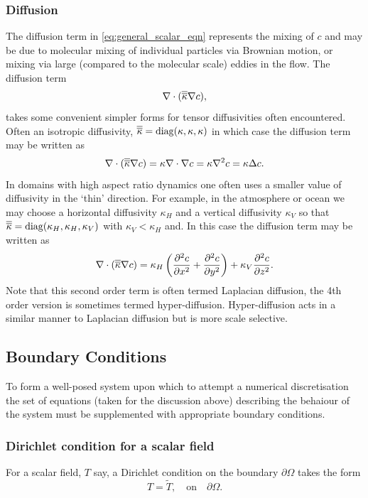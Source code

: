 \subsubsection{Diffusion}
The diffusion term in \eqref{eq:general_scalar_eqn} represents the mixing of $c$ and may be due to 
molecular mixing of individual particles via Brownian motion, or mixing via large (compared to the
molecular scale) eddies in the flow.
The diffusion term
\begin{equation}\label{eq:scalar_diffusion}
\nabla\cdot(\kaptens\nabla c),
\end{equation}
takes some convenient simpler forms for tensor diffusivities often encountered. Often an
isotropic diffusivity, $\kaptens = \mathrm{diag}(\kappa,\kappa,\kappa)$ in which case the diffusion term
may be written as
\begin{equation}\label{eq:scalar_isotropic_diffusion}
\nabla\cdot(\kaptens\nabla c) = \kappa\nabla\cdot\nabla c = \kappa\nabla^2 c = \kappa\Delta c.
\end{equation}
In domains with high aspect ratio dynamics one often uses a smaller value of diffusivity in the `thin'
direction. For example, in the atmosphere or ocean we may choose a horizontal diffusivity $\kappa_H$ and a
vertical diffusivity $\kappa_V$ so that
$\kaptens = \mathrm{diag}(\kappa_H,\kappa_H,\kappa_V)$ with $\kappa_V < \kappa_H$ and. 
In this case the diffusion term may be written as
\begin{equation}\label{eq:scalar_isotropic_diffusion}
\nabla\cdot(\kaptens\nabla c) = \kappa_H \left(\pptt[x]{c} + \pptt[y]{c}\right) + \kappa_V \pptt[z]{c}.
\end{equation}
Note that this second order term is often termed Laplacian diffusion, the 4th order version is sometimes
termed hyper-diffusion. Hyper-diffusion acts in a similar manner to Laplacian diffusion but is more
scale selective.

\subsection{Boundary Conditions} \label{Sect:BCs}


To form a well-posed system upon which to attempt a numerical discretisation the
set of equations (taken for the discussion above) describing the behaiour of the 
system must be supplemented with appropriate boundary conditions.


\subsubsection{Dirichlet condition for a scalar field}\label{sect:bc_scalar_dirichlet}
For a scalar field, $T$ say, a Dirichlet condition on the boundary
$\partial\Omega$ takes the form
\begin{equation*}
T=\tilde{T},\quad \textrm{on}\quad \partial\Omega.
\end{equation*}


